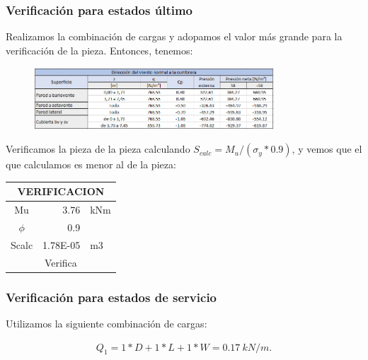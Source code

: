 \documentclass[../main.tex]{subfiles}
\begin{document}
\clearpage

\subsubsection{Verificación para estados último}

Realizamos la combinación de cargas y adopamos el valor más grande para la 
verificación de la pieza. Entonces, tenemos:

\begin{figure}[htpb]
  \centering
  \includegraphics[width=0.8\textwidth]{../images/normal_cumbrera}
  \label{fig:normal_cumbrera}
\end{figure}

Verificamos la pieza de la pieza calculando $S_{calc}= M_u / (\sigma_y * 0.9)$,
y vemos que el que calculamos es menor al de la pieza:

\begin{table}[htbp]
  \centering
    \begin{tabular}{|c|c|c|}
    \hline
    \multicolumn{3}{|c|}{\textbf{VERIFICACION}} \bigstrut\\
    \hline
    Mu    & \multicolumn{1}{r|}{3.76} & \multicolumn{1}{l|}{kNm} \bigstrut\\
    \hline
    $\phi$     & \multicolumn{1}{r|}{0.9} &  \bigstrut\\
    \hline
    Scalc & \multicolumn{1}{r|}{1.78E-05} & \multicolumn{1}{l|}{m3} \bigstrut\\
    \hline
    \multicolumn{3}{|c|}{Verifica} \bigstrut\\
    \hline
    \end{tabular}%
  \label{tab:addlabel}%
\end{table}%

\subsubsection{Verificación para estados de servicio}

Utilizamos la siguiente combinación de cargas:

\begin{align*}
  Q_1 = 1*D + 1*L + 1*W = \SI{0.17}{kN / m}
.\end{align*}
\end{document}
